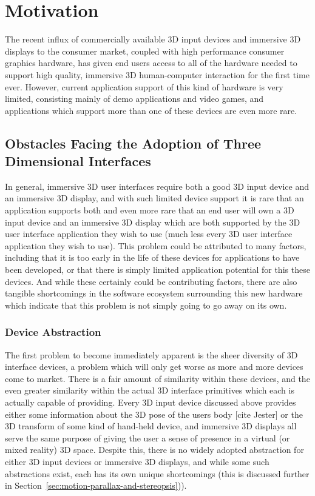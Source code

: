 \chapter{Motivation}
The recent influx of commercially available 3D input devices and immersive 3D displays to the consumer market, coupled with high performance consumer graphics hardware, has given end users access to all of the hardware needed to support high quality, immersive 3D human-computer interaction for the first time ever. However, current application support of this kind of hardware is very limited, consisting mainly of demo applications and video games, and applications which support more than one of these devices are even more rare. 

\section{Obstacles Facing the Adoption of Three Dimensional Interfaces}

In general, immersive 3D user interfaces require both a good 3D input device and an immersive 3D display, and with such limited device support it is rare that an application supports both and even more rare that an end user will own a 3D input device and an immersive 3D display which are both supported by the 3D user interface application they wish to use (much less every 3D user interface application they wish to use). This problem could be attributed to many factors, including that it is too early in the life of these devices for applications to have been developed, or that there is simply limited application potential for this these devices. And while these certainly could be contributing factors, there are also tangible shortcomings in the software ecosystem surrounding this new hardware which indicate that this problem is not simply going to go away on its own.

\subsection{Device Abstraction}

The first problem to become immediately apparent is the sheer diversity of 3D interface devices, a problem which will only get worse as more and more devices come to market. There is a fair amount of similarity within these devices, and the even greater similarity within the actual 3D interface primitives which each is actually capable of providing. Every 3D input device discussed above provides either some information about the 3D pose of the users body [cite Jester] or the 3D transform of some kind of hand-held device, and immersive 3D displays all serve the same purpose of giving the user a sense of presence in a virtual (or mixed reality) 3D space. Despite this, there is no widely adopted abstraction for either 3D input devices or immersive 3D displays, and while some such abstractions exist, each has its own unique shortcomings (this is discussed further in Section~\ref{sec:motion-parallax-and-stereopsis})). 

